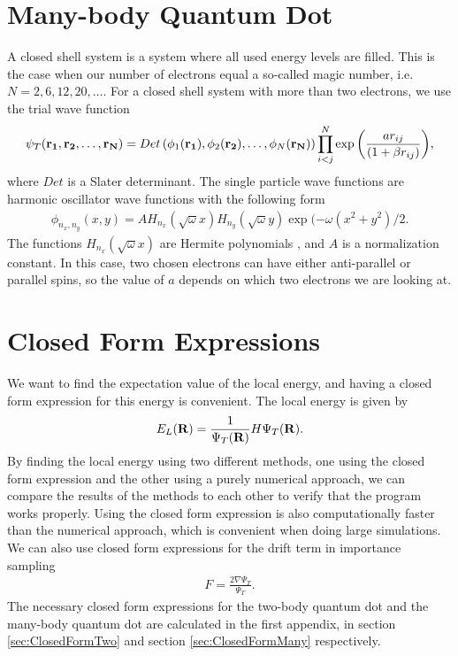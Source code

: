 \documentclass[../main.tex]{subfiles}
\begin{document}
\section{Many-body Quantum Dot}
A closed shell system is a system where all used energy levels are filled. This is the case when our number of electrons equal a so-called magic number, i.e. $N=2,6,12,20,\dots$. For a closed shell system with more than two electrons, we use the trial wave function 
\begin{align}
    \psi_{T}({\bf r_1},{\bf r_2},\dots, {\bf r_N}) = 
   Det\left(\phi_{1}({\bf r_1}),\phi_{2}({\bf r_2}),
   \dots,\phi_{N}({\bf r_N})\right)
   \prod_{i<j}^{N}\exp{\left(\frac{a r_{ij}}{(1+\beta r_{ij})}\right)}, 
\end{align}
where $Det$ is a Slater determinant. The single particle wave functions
are harmonic oscillator wave functions with the following form
\begin{align}\label{eq: HO SPWF}
    \phi_{n_x,n_y}(x,y) = A H_{n_x}(\sqrt{\omega}x)H_{n_y}(\sqrt{\omega}y)\exp{(-\omega(x^2+y^2)/2}.
\end{align}
The functions $H_{n_x}(\sqrt{\omega}x)$ are Hermite polynomials \cite{Hermite}, and $A$ is a normalization constant. In this case, two chosen electrons can have either anti-parallel or parallel spins, so the value of $a$ depends on which two electrons we are looking at.

\section{Closed Form Expressions}\label{sec:CF}
We want to find the expectation value of the local energy, and having a closed form expression for this energy is convenient. The local energy is given by 
\begin{align}\label{eq: E_L}
    E_L({\bf R})=\frac{1}{\Psi_T({\bf R})}H\Psi_T({\bf R}).
\end{align}
By finding the local energy using two different methods, one using the closed form expression and the other using a purely numerical approach, we can compare the results of the methods to each other to verify that the program works properly. Using the closed form expression is also computationally faster than the numerical approach, which is convenient when doing large simulations. We can also use closed form expressions for the drift term in importance sampling 
\begin{align}
    F = \frac{2\nabla \Psi_T}{\Psi_T}.    
\end{align}
The necessary closed form expressions for the two-body quantum dot and the many-body quantum dot are calculated in the first appendix, in section \ref{sec:ClosedFormTwo} and section \ref{sec:ClosedFormMany} respectively.
\end{document}
